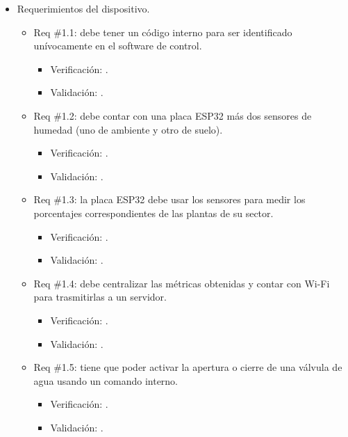 \documentclass[
11pt, %
codirector, %
]{charter}
\begin{document}
\begin{itemize}
\item Requerimientos del dispositivo.
	\begin{itemize}
	\item Req \#1.1: debe tener un código interno para ser identificado unívocamente en el software de control.
		\begin{itemize}
		\item Verificación: .
		\item Validación: .\\
		\end{itemize}
		
	\item Req \#1.2: debe contar con una placa ESP32 más dos sensores de humedad (uno de ambiente y otro de suelo).
		\begin{itemize}
		\item Verificación: .
		\item Validación: .\\
		\end{itemize}
		
	\item Req \#1.3: la placa ESP32 debe usar los sensores para medir los porcentajes correspondientes de las plantas de su sector.
		\begin{itemize}
		\item Verificación: .
		\item Validación: .\\
		\end{itemize}
		 
	\item Req \#1.4: debe centralizar las métricas obtenidas y contar con Wi-Fi para trasmitirlas a un servidor.
		\begin{itemize}
		\item Verificación: .
		\item Validación: .\\
		\end{itemize}
		 
	\item Req \#1.5: tiene que poder activar la apertura o cierre de una válvula de agua usando un comando interno.
		\begin{itemize}
		\item Verificación: .
		\item Validación: .\\
		\end{itemize}
		
	\end{itemize}
	

\end{itemize}
\end{document}
